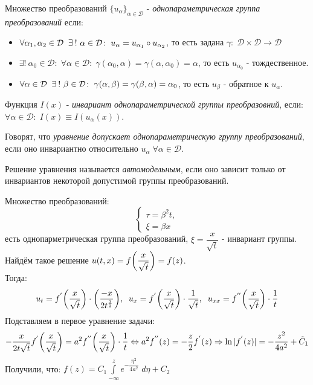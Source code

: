 \documentclass[../main.tex]{subfiles}
\begin{document}
\begin{definition} 
	Множество преобразований $\{u_{\alpha}\}_{\alpha \in \mathcal{D}}$ - \textit{однопараметрическая группа преобразований} если:
	\begin{itemize}
	\item $\forall \alpha_1, \alpha_2 \in \mathcal{D} \;\;\exists\: !~ \alpha \in \mathcal{D}\colon\; u_{\alpha} = u_{\alpha_1} \circ u_{\alpha_2}$, то есть задана $\gamma\colon\; \mathcal{D} \times \mathcal{D} \to \mathcal{D}$
	\item $\exists ! ~\alpha_{0} \in \mathcal{D}\colon\; \forall \alpha \in \mathcal{D}\colon\; \gamma(\alpha_0, \alpha) = \gamma(\alpha, \alpha_0) = \alpha$, то есть $u_{\alpha_0}$ - тождественное.
	\item $\forall \alpha \in \mathcal{D}\;\;\exists\: !~ \beta \in \mathcal{D}\colon\; \gamma(\alpha, \beta) = \gamma(\beta, \alpha) = \alpha_0$, то есть $u_{\beta}$ - обратное к $u_{\alpha}$.
\end{itemize}
\end{definition}
\begin{definition}
Функция $I(x)$ - \textit{инвариант однопараметрической группы преобразовний}, если: $\forall \alpha \in \mathcal{D}\colon\; I(x) \equiv I(u_{\alpha}(x))$.
\end{definition}
\begin{definition}
	Говорят, что \textit{уравнение допускает однопараметрическую группу преобразований}, если оно инвариантно относительно $u_{\alpha}\; \forall \alpha \in \mathcal{D}$.
\end{definition}
\begin{definition}
Решение уравнения называется \textit{автомодельным}, если оно зависит только от инвариантов некоторой допустимой группы преобразований.
\end{definition}
Множество преобразований:
\begin{equation*}
\begin{cases}
	\tau = \beta^2 t, \\
	\xi = \beta x
\end{cases}
\end{equation*}
есть однопарметрическая группа преобразований, $\xi = \dfrac{x}{\sqrt{t}} $ - инвариант группы. \\
Найдём такое решение $u(t, x) = f\biggl(\dfrac{x}{\sqrt{t}}\biggr) = f(z)$. \\
Тогда:
\begin{equation*}
	u_t = f^{'}\biggl(\dfrac{x}{\sqrt{t}}\biggr) \cdot \biggl(\dfrac{-x}{2t^{\frac{3}{2}}}\biggr), \; \; u_x = f^{'}\biggl(\dfrac{x}{\sqrt{t}}\biggr) \cdot \dfrac{1}{\sqrt{t}},\; \; u_{xx} = f^{''}\biggl(\dfrac{x}{\sqrt{t}}\biggr) \cdot \dfrac{1}{t}
\end{equation*}
Подставляем в первое уравнение задачи:
\begin{equation*}
	-\dfrac{x}{2t\sqrt{t}} f^{'}\biggl(\dfrac{x}{\sqrt{t}}\biggr) = a^2 f^{''}\biggl(\dfrac{x}{\sqrt{t}}\biggr) \cdot \dfrac{1}{t} \Leftrightarrow a^2f^{''}(z) = -\dfrac{z}{2}f^{'}(z) \Rightarrow \ln|f^{'}(z)| = -\dfrac{z^2}{4a^2} + \tilde{C}_1
\end{equation*}
Получили, что: $f(z) = C_1 \displaystyle\int\limits_{-\infty}^z e^{-\dfrac{\eta^2}{4a^2}}\;d\eta + C_2$
\end{document}
